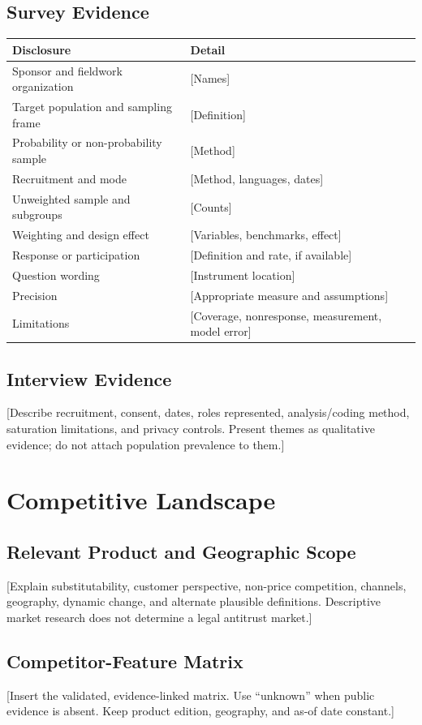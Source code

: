 \documentclass[11pt,letterpaper]{report}
\begin{document}
\section{Survey Evidence}
\begin{longtable}{@{}p{}p{}@{}}
\toprule
Disclosure & Detail \\
\midrule
\endhead
Sponsor and fieldwork organization & [Names] \\
Target population and sampling frame & [Definition] \\
Probability or non-probability sample & [Method] \\
Recruitment and mode & [Method, languages, dates] \\
Unweighted sample and subgroups & [Counts] \\
Weighting and design effect & [Variables, benchmarks, effect] \\
Response or participation & [Definition and rate, if available] \\
Question wording & [Instrument location] \\
Precision & [Appropriate measure and assumptions] \\
Limitations & [Coverage, nonresponse, measurement, model error] \\
\bottomrule
\end{longtable}

\section{Interview Evidence}
[Describe recruitment, consent, dates, roles represented, analysis/coding
method, saturation limitations, and privacy controls. Present themes as
qualitative evidence; do not attach population prevalence to them.]

\chapter{Competitive Landscape}

\section{Relevant Product and Geographic Scope}
[Explain substitutability, customer perspective, non-price competition,
channels, geography, dynamic change, and alternate plausible definitions.
Descriptive market research does not determine a legal antitrust market.]

\section{Competitor-Feature Matrix}
[Insert the validated, evidence-linked matrix. Use ``unknown'' when public
evidence is absent. Keep product edition, geography, and as-of date constant.]
\end{document}
